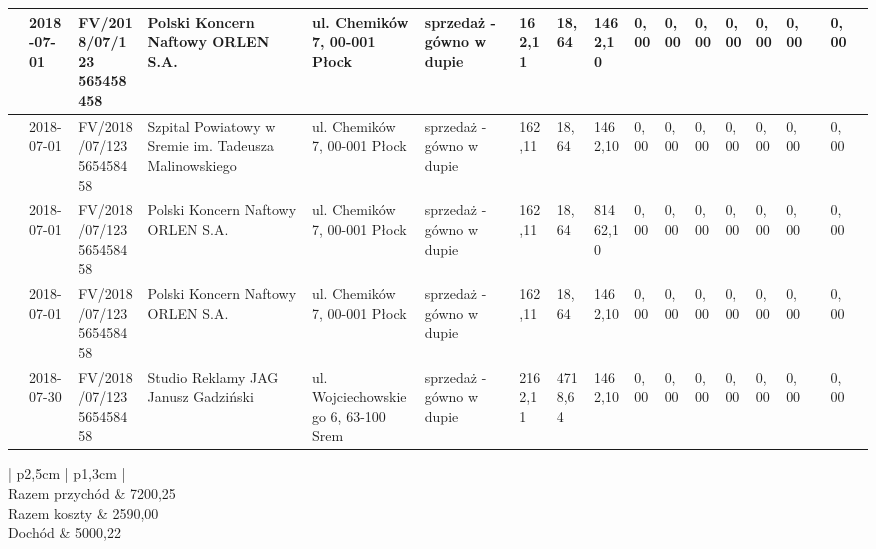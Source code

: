 \documentclass[a4paper,10pt,landscape]{article}
\begin{document}
\begin{table}[H]
\begin{tabular}{|p{} | p{}  | p{2cm} | p{2cm}| p{2cm} | p{1cm} | p{} | p{} | p{} | p{} | p{} | p{} | p{} | p{} | p{} | p{} | p{} | p{} |}
			\centering{1} & 2018-07-01 &  \parbox[t]{2cm}{FV/2018/07/123\\565458458} & Polski Koncern Naftowy ORLEN S.A. & ul. Chemików 7, 00-001 Płock & sprzedaż - gówno w dupie & 162,11 & 18,64 & 1462,10 & 0,00 & 0,00 & 0,00 & 0,00 & 0,00 & 0,00 & &0,00  & \\ \hline
				 & 2018-07-01 &  \parbox[t]{2cm}{FV/2018/07/123\\565458458} & Szpital Powiatowy w Sremie im. Tadeusza Malinowskiego & ul. Chemików 7, 00-001 Płock & sprzedaż - gówno w dupie & 162,11 & 18,64 & 1462,10 & 0,00 & 0,00 & 0,00 & 0,00 & 0,00 & 0,00 & &0,00  & \\ \hline
					 & 2018-07-01 &  \parbox[t]{2cm}{FV/2018/07/123\\565458458} & Polski Koncern Naftowy ORLEN S.A. & ul. Chemików 7, 00-001 Płock & sprzedaż - gówno w dupie & 162,11 & 18,64 & 81462,10 & 0,00 & 0,00 & 0,00 & 0,00 & 0,00 & 0,00 & &0,00  & \\ \hline
						 & 2018-07-01 &  \parbox[t]{2cm}{FV/2018/07/123\\565458458} & Polski Koncern Naftowy ORLEN S.A. & ul. Chemików 7, 00-001 Płock & sprzedaż - gówno w dupie & 162,11 & 18,64 & 1462,10 & 0,00 & 0,00 & 0,00 & 0,00 & 0,00 & 0,00 & &0,00  & \\ \hline
						 & 2018-07-30 &  \parbox[t]{2cm}{FV/2018/07/123\\565458458} & Studio Reklamy JAG Janusz Gadziński & ul. Wojciechowskiego 6, 63-100 Srem & sprzedaż - gówno w dupie & 2162,11 & 4718,64 & 1462,10 & 0,00 & 0,00 & 0,00 & 0,00 & 0,00 & 0,00 & &0,00  & \\ \hline
			
		\end{tabular}
	\end{table}
	
\vfill
		\begin{table}[H]
			\begin{flushright}
				\scriptsize
		\begin{tabular}{| p{} | p{} |}
			\hline
			 \\ \hline
			Razem przychód & 7200,25 \\ \hline
			Razem koszty & 2590,00 \\ \hline
			\hline
			Dochód & 5000,22  \\ \hline
		\end{tabular}
	\end{flushright}
	\end{table}

	
\end{document}
